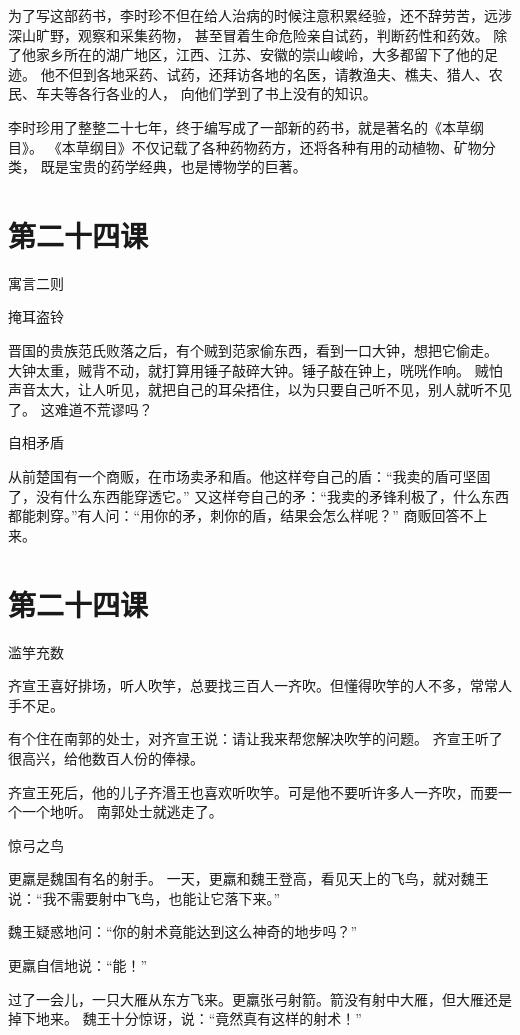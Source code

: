 \documentclass[12pt,UTF8]{ctexbook}
\begin{document}
为了写这部药书，李时珍不但在给人治病的时候注意积累经验，还不辞劳苦，远涉深山旷野，观察和采集药物，
甚至冒着生命危险亲自试药，判断药性和药效。
除了他家乡所在的湖广地区，江西、江苏、安徽的崇山峻岭，大多都留下了他的足迹。
他不但到各地采药、试药，还拜访各地的名医，请教渔夫、樵夫、猎人、农民、车夫等各行各业的人，
向他们学到了书上没有的知识。

李时珍用了整整二十七年，终于编写成了一部新的药书，就是著名的《本草纲目》。
《本草纲目》不仅记载了各种药物药方，还将各种有用的动植物、矿物分类，
既是宝贵的药学经典，也是博物学的巨著。

\section{第二十四课}

寓言二则

掩耳盗铃

晋国的贵族范氏败落之后，有个贼到范家偷东西，看到一口大钟，想把它偷走。
大钟太重，贼背不动，就打算用锤子敲碎大钟。锤子敲在钟上，咣咣作响。
贼怕声音太大，让人听见，就把自己的耳朵捂住，以为只要自己听不见，别人就听不见了。
这难道不荒谬吗？

自相矛盾

从前楚国有一个商贩，在市场卖矛和盾。他这样夸自己的盾：“我卖的盾可坚固了，没有什么东西能穿透它。”
又这样夸自己的矛：“我卖的矛锋利极了，什么东西都能刺穿。”有人问：“用你的矛，刺你的盾，结果会怎么样呢？”
商贩回答不上来。

\section{第二十四课}

滥竽充数

齐宣王喜好排场，听人吹竽，总要找三百人一齐吹。但懂得吹竽的人不多，常常人手不足。

有个住在南郭的处士，对齐宣王说：请让我来帮您解决吹竽的问题。
齐宣王听了很高兴，给他数百人份的俸禄。

齐宣王死后，他的儿子齐湣王也喜欢听吹竽。可是他不要听许多人一齐吹，而要一个一个地听。
南郭处士就逃走了。

惊弓之鸟

更羸是魏国有名的射手。
一天，更羸和魏王登高，看见天上的飞鸟，就对魏王说：“我不需要射中飞鸟，也能让它落下来。”

魏王疑惑地问：“你的射术竟能达到这么神奇的地步吗？”

更羸自信地说：“能！”

过了一会儿，一只大雁从东方飞来。更羸张弓射箭。箭没有射中大雁，但大雁还是掉下地来。
魏王十分惊讶，说：“竟然真有这样的射术！”
\end{document}

